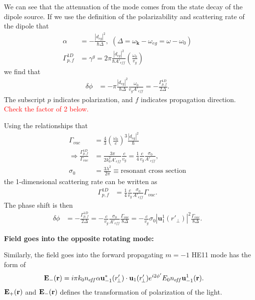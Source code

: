 We can see that the attenuation of the mode comes from the state decay of the dipole source. If we use the definition of the polarizability and scattering rate of the dipole that 
\begin{align}
\alpha &=-\frac{|d_{eg}|^2}{\hbar \Delta}, \,\, (\Delta=\omega_{\mathbf{k}}-\omega_{eg}=\omega-\omega_0)\\
\Gamma^{1D}_{p,f} &= \gamma^g=2\pi \frac{|d_{eg}|^2}{\hbar A'_{e\!f\!f}}\left(\frac{\omega_0}{v_g} \right)
\end{align}
we find that 
\begin{align}\label{phaseshiftGamma1D}
\delta\phi &= -\pi \frac{|d_{eg}|^2}{\hbar \Delta} \frac{\omega_0}{v_gA'_{e\!f\!f}}=-\frac{\Gamma^{1\!D}_{p,f}}{2\Delta}.
\end{align}
The subscript $ p $ indicates polarization, and $ f $ indicates propagation direction. \textcolor{red}{Check the factor of 2 below.}


Using the relationships that 
\begin{align}
\Gamma_{vac} &= \frac{4}{3} \left( \frac{\omega_0}{c}\right)^3 \frac{|d_{eg}|^2}{\hbar}\\
\Rightarrow \frac{\Gamma^{1\!D}_{p,f}}{\Gamma_{vac}} &= \frac{3\pi}{2k_0^2A'_{e\!f\!f}} \frac{c}{v_g} = \frac{1}{4} \frac{c}{v_g} \frac{\sigma_0}{A'_{e\!f\!f}},\\
\sigma_0 &= \frac{3\lambda^2}{2\pi} \equiv \text{resonant cross section}
\end{align}
the 1-dimensional scattering rate can be written as 
\begin{align}\label{Gamma1DGammavac}
\Gamma^{1\!D}_{p,f} &= \frac{1}{4} \frac{c}{v_g} \frac{\sigma_0}{A'_{e\!f\!f}}\Gamma_{vac}.
\end{align}
The phase shift is then
\begin{align}
\delta\phi &= -\frac{\Gamma^{1\!D}_{p,f}}{2\Delta} = -\frac{c}{v_g} \frac{\sigma_0 }{A'_{e\!f\!f}} \frac{\Gamma_{vac}}{8\Delta} = -\frac{c}{v_g} \sigma_0 |\mathbf{u}_1^1 (r'_{\!\perp})|^2 \frac{\Gamma_{vac}}{8\Delta}.
\end{align}

\bigskip
\textbf{Field goes into the opposite rotating mode:}

Similarly, the field goes into the forward propagating $ m=-1 $ HE11 mode has the form of 
\begin{align}
\mathbf{E}_{-}(\mathbf{r}) &=  i\pi k_0 n_{e\!f\!f}\alpha  \mathbf{u}^*_{-1}(r'_{\!\perp})\cdot \mathbf{u}_1(r'_{\!\perp})e^{i2\phi'}E_0n_{e\!f\!f}\mathbf{u}_{-1}^1(\mathbf{r}).
\end{align}
$ \mathbf{E}_{+}(\mathbf{r}) $ and $\mathbf{E}_{-}(\mathbf{r})$ defines the transformation of polarization of the light. 

